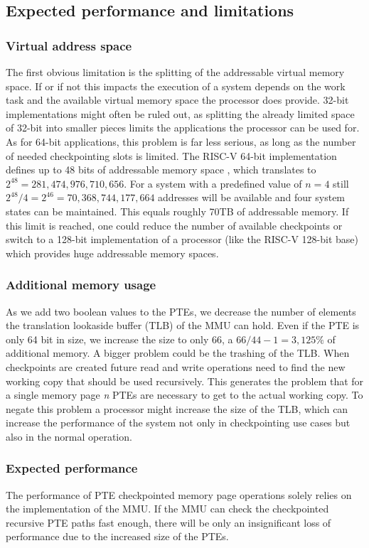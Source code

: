 \subsection{Expected performance and limitations}
\subsubsection{Virtual address space}
The first obvious limitation is the splitting of the addressable
virtual memory space. If or if not this impacts the execution
of a system depends on the work task and the available
virtual memory space the processor does provide.
32-bit implementations might often be ruled out, as splitting
the already limited space of 32-bit into smaller pieces
limits the applications the processor can be used for. As for 64-bit applications,
this problem is far less serious, as long as the
number of needed checkpointing slots is limited.
The RISC-V 64-bit implementation defines up to 48 bits of addressable
memory space \cite[p.~63]{risc-v_isa_manual_priviliged_arch},
which translates to $2^{48} = 281,474,976,710,656$.
For a system with a predefined value of $n=4$ still
$2^{48}/4 = 2^{46} = 70,368,744,177,664$ addresses will be available
and four system states can be maintained.
This equals roughly 70TB of addressable memory.
If this limit is reached, one could reduce the number
of available checkpoints or switch to a 128-bit implementation
of a processor (like the RISC-V 128-bit base)
which provides huge addressable memory spaces.

\subsubsection{Additional memory usage}
As we add two boolean values to the PTEs, we decrease the
number of elements the translation lookaside buffer (TLB) of the
MMU can hold. Even if the PTE is only 64 bit in size, we
increase the size to only 66, a $66/44 - 1 = 3,125\%$
of additional memory.
A bigger problem could be the trashing of the TLB.
When checkpoints are created future read and write
operations need to find the new working copy that
should be used recursively. This generates the problem that
for a single memory page \textit{n} PTEs are necessary to
get to the actual working copy.
To negate this problem a processor might increase the size
of the TLB, which can increase the performance
of the system not only in checkpointing use cases
but also in the normal operation.

\subsubsection{Expected performance}
The performance of PTE checkpointed memory page operations
solely relies on the implementation of the MMU.
If the MMU can check the checkpointed recursive PTE paths
fast enough, there will be only an insignificant loss
of performance due to the increased size of the PTEs.
